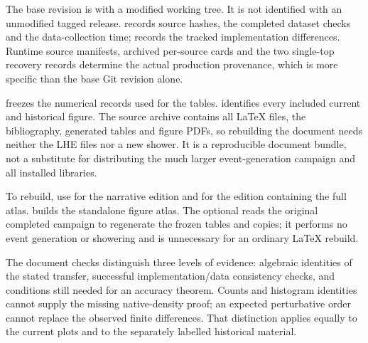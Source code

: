 The base revision is
 with a
modified working tree. It is not identified with an unmodified tagged
release.  records source hashes,
the completed dataset checks and the data-collection time;
 records the tracked
implementation differences. Runtime source manifests, archived
per-source cards and the two single-top recovery records determine the
actual production provenance, which is more specific than the base Git
revision alone.

 freezes the numerical records used
for the tables.  identifies every
included current and historical figure. The source archive contains all
LaTeX files, the bibliography, generated tables and figure PDFs, so
rebuilding the document needs neither the LHE files nor a new shower.
It is a reproducible document bundle, not a substitute for distributing
the much larger event-generation campaign and all installed libraries.

To rebuild, use  for the narrative edition and
 for the edition containing the full atlas.
 builds the standalone figure atlas. The optional
 reads the original completed campaign to regenerate
the frozen tables and copies; it performs no event generation or
showering and is unnecessary for an ordinary LaTeX rebuild.

The document checks distinguish three levels of evidence: algebraic
identities of the stated transfer, successful implementation/data
consistency checks, and conditions still needed for an accuracy theorem.
Counts and histogram identities cannot supply the missing native-density
proof; an expected perturbative order cannot replace the observed
finite differences. That distinction applies equally to the current
plots and to the separately labelled historical material.
